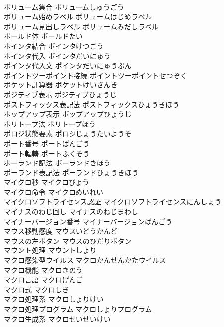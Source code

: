 \documentclass[8pt]{extreport}
\begin{document}
\begin{CJK}{UTF8}{min}
\\	ボリューム集合	ボリュームしゅうごう	
\\	ボリューム始めラベル	ボリュームはじめラベル	
\\	ボリューム見出しラベル	ボリュームみだしラベル	
\\	ボールド体	ボールドたい	
\\	ポインタ結合	ポインタけつごう	
\\	ポインタ代入	ポインタだいにゅう	
\\	ポインタ代入文	ポインタだいにゅうぶん	
\\	ポイントツーポイント接続	ポイントツーポイントせつぞく	
\\	ポケット計算器	ポケットけいさんき	
\\	ポジティブ表示	ポジティブひょうじ	
\\	ポストフィックス表記法	ポストフィックスひょうきほう	
\\	ポップアップ表示	ポップアップひょうじ	
\\	ポリトープ法	ポリトープほう	
\\	ポロジ状態要素	ポロジじょうたいようそ	
\\	ポート番号	ポートばんごう	
\\	ポート輻輳	ポートふくそう	
\\	ポーランド記法	ポーランドきほう	
\\	ポーランド表記法	ポーランドひょうきほう	
\\	マイクロ秒	マイクロびょう	
\\	マイクロ命令	マイクロめいれい	
\\	マイクロソフトライセンス認証	マイクロソフトライセンスにんしょう	
\\	マイナスのねじ回し	マイナスのねじまわし	
\\	マイナーバージョン番号	マイナーバージョンばんごう	
\\	マウス移動感度	マウスいどうかんど	
\\	マウスの左ボタン	マウスのひだりボタン	
\\	マウント処理	マウントしょり	
\\	マクロ感染型ウイルス	マクロかんせんかたウイルス	
\\	マクロ機能	マクロきのう	
\\	マクロ言語	マクロげんご	
\\	マクロ式	マクロしき	
\\	マクロ処理系	マクロしょりけい	
\\	マクロ処理プログラム	マクロしょりプログラム	
\\	マクロ生成系	マクロせいせいけい	

\end{CJK}
\end{document}
